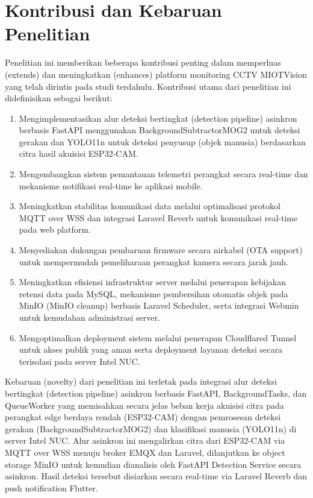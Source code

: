 \section{Kontribusi dan Kebaruan Penelitian}
Penelitian ini memberikan beberapa kontribusi penting dalam memperluas (extends) dan meningkatkan (enhances) platform monitoring CCTV MIOTVision yang telah dirintis pada studi terdahulu. Kontribusi utama dari penelitian ini didefinisikan sebagai berikut:
\begin{enumerate}
	\item Mengimplementasikan alur deteksi bertingkat (detection pipeline) asinkron berbasis FastAPI menggunakan BackgroundSubtractorMOG2 untuk deteksi gerakan dan YOLO11n untuk deteksi penyusup (objek manusia) berdasarkan citra hasil akuisisi ESP32-CAM.
	\item Mengembangkan sistem pemantauan telemetri perangkat secara real-time dan mekanisme notifikasi real-time ke aplikasi mobile.
	\item Meningkatkan stabilitas komunikasi data melalui optimalisasi protokol MQTT over WSS dan integrasi Laravel Reverb untuk komunikasi real-time pada web platform.
	\item Menyediakan dukungan pembaruan firmware secara nirkabel (OTA support) untuk mempermudah pemeliharaan perangkat kamera secara jarak jauh.
	\item Meningkatkan efisiensi infrastruktur server melalui penerapan kebijakan retensi data pada MySQL, mekanisme pembersihan otomatis objek pada MinIO (MinIO cleanup) berbasis Laravel Scheduler, serta integrasi Webmin untuk kemudahan administrasi server.
	\item Mengoptimalkan deployment sistem melalui penerapan Cloudflared Tunnel untuk akses publik yang aman serta deployment layanan deteksi secara terisolasi pada server Intel NUC.
\end{enumerate}

Kebaruan (novelty) dari penelitian ini terletak pada integrasi alur deteksi bertingkat (detection pipeline) asinkron berbasis FastAPI, BackgroundTasks, dan QueueWorker yang memisahkan secara jelas beban kerja akuisisi citra pada perangkat edge berdaya rendah (ESP32-CAM) dengan pemrosesan deteksi gerakan (BackgroundSubtractorMOG2) dan klasifikasi manusia (YOLO11n) di server Intel NUC. Alur asinkron ini mengalirkan citra dari ESP32-CAM via MQTT over WSS menuju broker EMQX dan Laravel, dilanjutkan ke object storage MinIO untuk kemudian dianalisis oleh FastAPI Detection Service secara asinkron. Hasil deteksi tersebut disiarkan secara real-time via Laravel Reverb dan push notification Flutter.